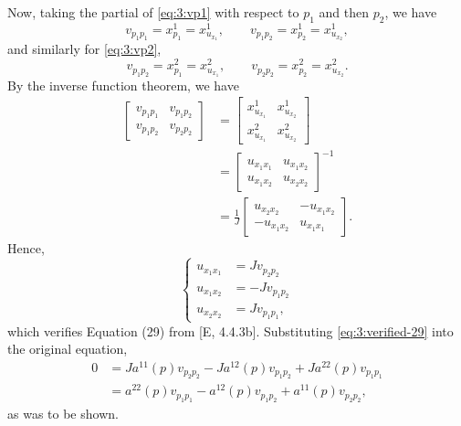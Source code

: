 \begin{solution}
  Now, taking the partial of \eqref{eq:3:vp1} with respect to \(p_1\) and
  then \(p_2\), we have
  \[
    v_{p_1p_1}=x^1_{p_1}=x^1_{u_{x_1}}, \qquad
    v_{p_1p_2}=x^1_{p_2}=x^1_{u_{x_2}},
  \]
  and similarly for \eqref{eq:3:vp2},
  \[
    v_{p_1p_2}=x^2_{p_1}=x^2_{u_{x_1}},\qquad
    v_{p_2p_2}=x^2_{p_2}=x^2_{u_{x_2}}.
  \]
  By the inverse function theorem, we have
  \begin{align*}
    \begin{bmatrix}
      v_{p_1p_1}&v_{p_1p_2}\\
      v_{p_1p_2}&v_{p_2p_2}
    \end{bmatrix}
    &=
      \begin{bmatrix}
        x^1_{u_{x_1}}&x^1_{u_{x_2}}\\
        x^2_{u_{x_1}}&x^2_{u_{x_2}}
      \end{bmatrix}
    \\
    &=\begin{bmatrix}
      u_{x_1x_1}&u_{x_1x_2}\\
      u_{x_1x_2}&u_{x_2x_2}
    \end{bmatrix}^{-1}\\
    &=\frac{1}{J}
      \begin{bmatrix}
      u_{x_2x_2}&-u_{x_1x_2}\\
      -u_{x_1x_2}&u_{x_1x_1}
    \end{bmatrix}.
  \end{align*}
  Hence,
  \begin{equation}
    \label{eq:3:verified-29}
    \left\{
      \begin{aligned}
        u_{x_1x_1}&=Jv_{p_2p_2}\\
        u_{x_1x_2}&=-Jv_{p_1p_2}\\
        u_{x_2x_2}&=Jv_{p_1p_1},
      \end{aligned}
    \right.
  \end{equation}
  which verifies Equation (29) from [E, 4.4.3b]. Substituting
  \eqref{eq:3:verified-29} into the original equation,
  \begin{align*}
    0&=Ja^{11}(p)v_{p_2p_2}-Ja^{12}(p)v_{p_1p_2}+Ja^{22}(p)v_{p_1p_1}\\
     &=a^{22}(p)v_{p_1p_1}-a^{12}(p)v_{p_1p_2}+a^{11}(p)v_{p_2p_2},
  \end{align*}
  as was to be shown.
\end{solution}
\newpage

